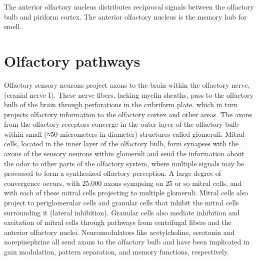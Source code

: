 \documentclass[]{book}
\begin{document}
The anterior olfactory nucleus distributes reciprocal signals between the olfactory bulb and piriform cortex. The anterior olfactory nucleus is the memory hub for smell.

\hypertarget{olfactory-pathways}{%
\section{Olfactory pathways}\label{olfactory-pathways}}

Olfactory sensory neurons project axons to the brain within the olfactory nerve, (cranial nerve I). These nerve fibers, lacking myelin sheaths, pass to the olfactory bulb of the brain through perforations in the cribriform plate, which in turn projects olfactory information to the olfactory cortex and other areas. The axons from the olfactory receptors converge in the outer layer of the olfactory bulb within small (≈50 micrometers in diameter) structures called glomeruli. Mitral cells, located in the inner layer of the olfactory bulb, form synapses with the axons of the sensory neurons within glomeruli and send the information about the odor to other parts of the olfactory system, where multiple signals may be processed to form a synthesized olfactory perception. A large degree of convergence occurs, with 25,000 axons synapsing on 25 or so mitral cells, and with each of these mitral cells projecting to multiple glomeruli. Mitral cells also project to periglomerular cells and granular cells that inhibit the mitral cells surrounding it (lateral inhibition). Granular cells also mediate inhibition and excitation of mitral cells through pathways from centrifugal fibers and the anterior olfactory nuclei. Neuromodulators like acetylcholine, serotonin and norepinephrine all send axons to the olfactory bulb and have been implicated in gain modulation, pattern separation, and memory functions, respectively.
\end{document}
